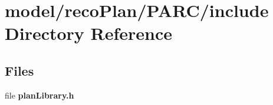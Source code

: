 \section{model/reco\+Plan/\+P\+A\+R\+C/include Directory Reference}
\label{dir_19f918f48d9c4f650cde986d19258912}
\subsection*{Files}
\begin{DoxyCompactItemize}
\item 
file \textbf{ plan\+Library.\+h}
\end{DoxyCompactItemize}
